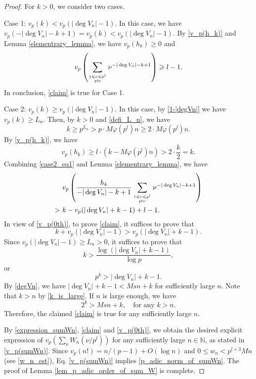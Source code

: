 \documentclass[12pt]{article}
\numberwithin{equation}{section}
\begin{document}
\begin{proof}
For $k>0$, we consider two cases. 

Case 1: $v_p(k) < v_p(|\deg V_n| - 1)$. In this case, we have $v_p(-|\deg V_n|-k+1) = v_p(k) < v_p(|\deg V_n| - 1)$. By \eqref{v_p(h_k)} and Lemma \ref{elementrary_lemma}, we have $v_p(h_k) \geqslant 0$ and 
\[ v_p\left( \sum_{1 \leqslant \nu \leqslant p^l \atop p \nmid \nu} \nu^{-|\deg V_n|-k+1} \right) \geqslant l-1. \]
In conclusion, \eqref{claim} is true for Case 1.

Case 2: $v_p(k) \geqslant v_p(|\deg V_n| - 1)$. In this case, by \eqref{1-|degVn|} we have $v_p(k) \geqslant L_n$. Then, by $k>0$ and \eqref{defi_L_n}, we have
\begin{equation}\label{k_is_large}
k \geqslant p^{L_n} > p \cdot M\varphi(p^l)n \geqslant 2 \cdot M\varphi(p^l)n.  
\end{equation}
By \eqref{v_p(h_k)}, we have
\begin{equation}\label{case2_eq1}
v_p(h_k) \geqslant l \cdot (k - M\varphi(p^l)n) > 2 \cdot \frac{k}{2} = k.  
\end{equation}
Combining \eqref{case2_eq1} and Lemma \ref{elementrary_lemma}, we have
\begin{align*}
&~ v_p\left(  \frac{h_k}{-|\deg V_n|-k+1} \sum_{1 \leqslant \nu \leqslant p^l \atop p \nmid \nu} \nu^{-|\deg V_n|-k+1}  \right) \\
>&~ k - v_p(|\deg V_n|+k-1) + l - 1. 
\end{align*}
In view of \eqref{v_p(0th)}, to prove \eqref{claim}, it suffices to prove that
\[ k + v_p\left( |\deg V_n| - 1 \right) > v_p(|\deg V_n|+k-1). \]
Since $v_p\left( |\deg V_n| - 1 \right) \geqslant L_n >0$, it suffices to prove that
\[ k > \frac{\log(|\deg V_n|+k-1)}{\log p}, \]
or
\begin{equation*}
p^k > |\deg V_n|+k-1. 
\end{equation*}
By \eqref{degVn}, we have $|\deg V_n|+k-1 < Msn + k$ for sufficiently large $n$.  Note that $k > n$ by \eqref{k_is_large}. If $n$ is large enough, we have
\[ 2^k > Msn + k, \quad \text{for any~} k > n. \]
Therefore, the claimed \eqref{claim} is true for any sufficiently large $n$. 

By \eqref{expression_sumWn}, \eqref{claim} and \eqref{v_p(0th)}, we obtain the desired explicit expression of $v_p(\sum_{\nu} W_n(\nu/p^l))$ for any sufficiently large $n \in \mathbb{N}$, as stated in \eqref{v_p(sumWn)}. Since $v_p(n!) = n/(p-1) + O(\log n)$ and $0 \leqslant w_n < p^{l+3}Mn$ (see \eqref{w_n_est}), Eq. \eqref{v_p(sumWn)} implies \eqref{p_adic_norm_of_sumWn}. The proof of Lemma \ref{lem_p_adic_order_of_sum_W} is complete.
\end{proof}
\end{document}
